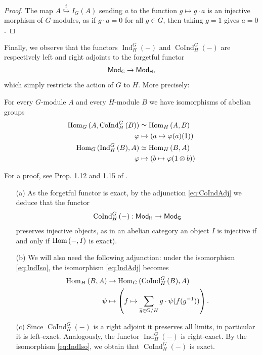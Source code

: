 \documentclass[a4paper, oneside]{memoir}
\begin{document}
\begin{proof}
	The map $A\overset{i}{\hookrightarrow} I_G(A)$ sending $a$ to the function $g\mapsto g\cdot a$ is an injective morphism of $G$-modules, as if $g\cdot a = 0 $ for all $g\in G$, then taking $g=1$ gives $a=0$.
\end{proof}

\noindent Finally, we observe that the functors $\operatorname{Ind}^G_H{(-)}$ and $\operatorname{CoInd}^G_H{(-)}$ are respectively left and right adjoints to the forgetful functor
\[
	\mathsf{Mod}_\mathsf{G}\to\mathsf{Mod}_\mathsf{H},
\]
which simply restricts the action of $G$ to $H$. More precisely:

\begin{proposition}
	For every $G$-module $A$ and every $H$-module $B$ we have isomorphisms of abelian groups
	\begin{align}
		\operatorname{Hom}_G{(A,\operatorname{CoInd}^G_H{(B)})} & \simeq \operatorname{Hom}_H{(A,B)}\label{eq:CoIndAdj}                    \\
		\varphi                                   & \mapsto (a\mapsto \varphi(a)(1)) \nonumber                 \\
		\operatorname{Hom}_G{(\operatorname{Ind}^G_H{(B)},A)}   & \simeq \operatorname{Hom}_H{(B,A)}\label{eq:IndAdj}                      \\
		\varphi                                   & \mapsto \left(b\mapsto \varphi(1\otimes b)\right)\nonumber
	\end{align}
\end{proposition}
\noindent For a proof, see Prop. 1.12 and 1.15 of \cite{Harari}.

\begin{remark}\label{rm:Adj}
	\begin{itemize}
		\item[(a)] As the forgetful functor is exact, by the adjunction \eqref{eq:CoIndAdj} we deduce that the functor
		      \[
			      \operatorname{CoInd}^G_H{(-)}:\mathsf{Mod}_\mathsf{H}\to\mathsf{Mod}_\mathsf{G}
		      \]
		      preserves injective objects, as in an abelian category an object $I$ is injective if and only if $\operatorname{Hom}{(-,I)}$ is exact).
		\item[(b)] We will also need the following adjunction: under the isomorphism \eqref{eq:IndIso}, the isomorphism \eqref{eq:IndAdj} becomes
		      \begin{align*}
			      \operatorname{Hom}_H{(B,A)} & \to \operatorname{Hom}_G{(\operatorname{CoInd}^G_H{(B)},A)}                                        \\
			      \psi          & \mapsto \left(f\mapsto \sum_{\overline{g} \in G / H}{g\cdot \psi(f(g^{-1}))}\right).
		      \end{align*}
		\item[(c)] Since $\operatorname{CoInd}^G_H{(-)}$ is a right adjoint it preserves all limits, in particular it is left-exact. Analogously, the functor $\operatorname{Ind}^G_H{(-)}$ is right-exact. By the isomorphism \eqref{eq:IndIso}, we obtain that $\operatorname{CoInd}^G_H{(-)}$ is exact.
	\end{itemize}
\end{remark}
\end{document}

